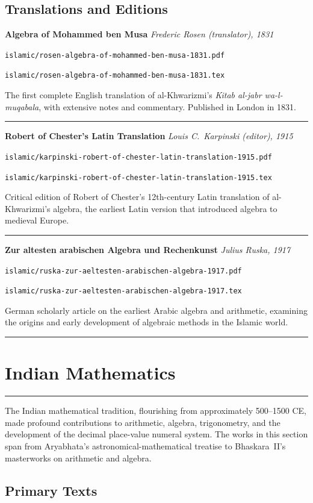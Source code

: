 \documentclass[11pt,a4paper]{article}
\newcommand{\workitem}[5]{%
  \par\smallskip
  \noindent\textbf{\large #1} \hfill \textit{#2}\par
  \noindent\texttt{\small #3}\par
  \noindent\texttt{\small #4}\par
  \noindent #5\par
  \smallskip\noindent\rule{\textwidth}{0.2pt}
}
\newcommand{\indiansection}[1]{%
  \section[{#1}]{\textcolor{indiancolor}{#1}}
}
\begin{document}
\subsection*{Translations and Editions}

\workitem
  {Algebra of Mohammed ben Musa}
  {Frederic Rosen (translator), 1831}
  {islamic/rosen-algebra-of-mohammed-ben-musa-1831.pdf}
  {islamic/rosen-algebra-of-mohammed-ben-musa-1831.tex}
  {The first complete English translation of al-Khwarizmi's \textit{Kitab al-jabr wa-l-muqabala}, with extensive notes and commentary. Published in London in 1831.}

\workitem
  {Robert of Chester's Latin Translation}
  {Louis C.~Karpinski (editor), 1915}
  {islamic/karpinski-robert-of-chester-latin-translation-1915.pdf}
  {islamic/karpinski-robert-of-chester-latin-translation-1915.tex}
  {Critical edition of Robert of Chester's 12th-century Latin translation of al-Khwarizmi's algebra, the earliest Latin version that introduced algebra to medieval Europe.}

\workitem
  {Zur altesten arabischen Algebra und Rechenkunst}
  {Julius Ruska, 1917}
  {islamic/ruska-zur-aeltesten-arabischen-algebra-1917.pdf}
  {islamic/ruska-zur-aeltesten-arabischen-algebra-1917.tex}
  {German scholarly article on the earliest Arabic algebra and arithmetic, examining the origins and early development of algebraic methods in the Islamic world.}

\newpage

\indiansection{Indian Mathematics}
\label{sec:indian}

\begin{center}
\textcolor{indiancolor}{\rule{0.8\textwidth}{1pt}}
\end{center}

The Indian mathematical tradition, flourishing from approximately 500--1500 CE, made profound contributions to arithmetic, algebra, trigonometry, and the development of the decimal place-value numeral system. The works in this section span from Aryabhata's astronomical-mathematical treatise to Bhaskara~II's masterworks on arithmetic and algebra.

\subsection*{Primary Texts}
\end{document}
